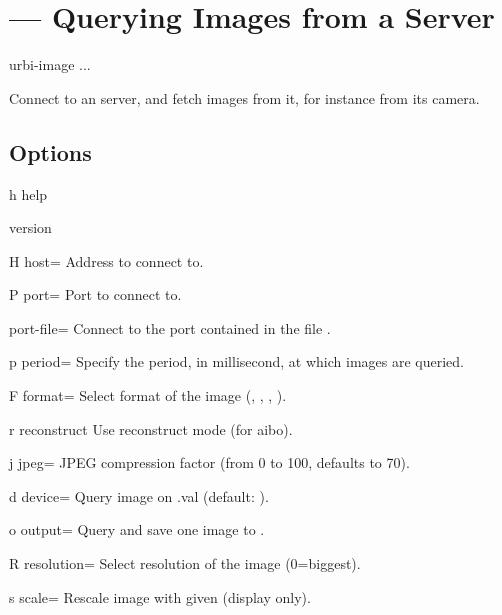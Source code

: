 \section{ --- Querying Images from a Server}
\label{sec:tools:urbi-image}

\begin{shell}
urbi-image ...
\end{shell}

Connect to an \urbi server, and fetch images from it, for instance
from its camera.

\subsection{Options}

\begin{options}
\item[h]{help} \optionHelp
\item{version} \optionVersion
\end{options}

\begin{options}[Networking]
\item[H]{host=} Address to connect to.
\item[P]{port=} Port to connect to.
\item{port-file=} Connect to the port contained in the file
  .
\end{options}

\begin{options}[Tuning]
\item[p]{period=} Specify the period, in millisecond, at
  which images are queried.
\item[F]{format=} Select format of the image (,
  , , ).
\item[r]{reconstruct} Use reconstruct mode (for aibo).
\item[j]{jpeg=} JPEG compression factor (from 0 to 100,
  defaults to 70).
\item[d]{device=} Query image on .val
  (default: ).
\item[o]{output=} Query and save one image to .
\item[R]{resolution=} Select resolution of the image
  (0=biggest).
\item[s]{scale=} Rescale image with given 
  (display only).
\end{options}


